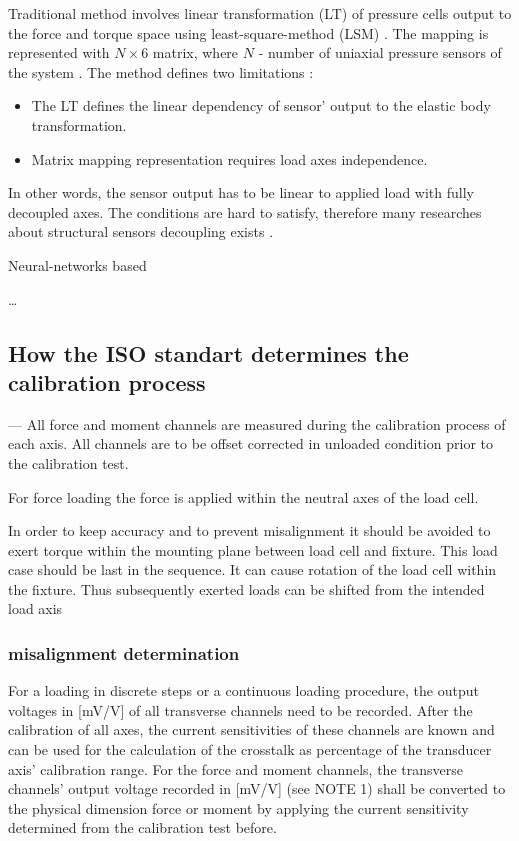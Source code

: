 Traditional method involves linear transformation (LT) of pressure cells output to the force and torque space using least-square-method (LSM) \cite{Deep_Learning_Calib}.
The mapping is represented with $N\times6$ matrix, where $N$ - number of uniaxial pressure sensors of the system \cite{Deep_Learning_Calib}.
The method defines two limitations \cite{Deep_Learning_Calib}:

\begin{itemize}
    \item The LT defines the linear dependency of sensor' output to the elastic body transformation.
    \item Matrix mapping representation requires load axes independence. 
\end{itemize}

In other words, the sensor output has to be linear to applied load with fully decoupled axes. 
The conditions are hard to satisfy, therefore many researches about structural sensors decoupling exists 
\cite{beam_structure_math,decoupling_sliding_structure,shape_optimization_decoupled,modal_sensor}.

Neural-networks based 

\dots

\subsection{How the ISO standart determines the calibration process}

— All force and moment channels are measured during the calibration process of each axis. All channels
are to be offset corrected in unloaded condition prior to the calibration test.

For force loading the force is applied within the neutral axes of the load cell.

In order to keep accuracy and to prevent  misalignment it should be avoided to exert torque within the mounting plane between load cell and fixture. 
This load case should be last in the sequence. It can cause rotation of the load cell within the fixture. Thus subsequently exerted loads can be shifted from the intended load axis

\subsubsection{misalignment determination}

For a loading in discrete steps or a continuous loading procedure, the output voltages in [mV/V] of all
transverse channels need to be recorded.
After the calibration of all axes, the current sensitivities of these channels are known and can be used
for the calculation of the crosstalk as percentage of the transducer axis’ calibration range.
For the force and moment channels, the transverse channels’ output voltage recorded in [mV/V]
(see NOTE 1) shall be converted to the physical dimension force or moment by applying the current
sensitivity determined from the calibration test before. 


